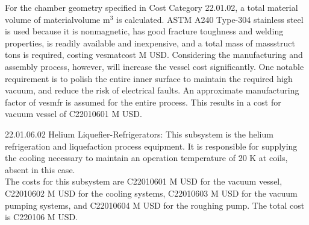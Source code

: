 For the chamber geometry specified in Cost Category 22.01.02, a total material volume of materialvolume m$^3$ is calculated. ASTM A240 Type-304 stainless steel is used because it is nonmagnetic, has good fracture toughness and welding properties, is readily available and inexpensive, and a total mass of massstruct tons is required, costing vesmatcost M USD. Considering the manufacturing and assembly process, however, will increase the vessel cost significantly. One notable requirement is to polish the entire inner surface to maintain the required high vacuum, and reduce the risk of electrical faults. An approximate manufacturing factor of vesmfr is assumed for the entire process. This results in a cost for vacuum vessel of C22010601 M USD.\\

\begin{table}[h]
    \centering
    \caption{Vacuum vessel parameters.}
    \label{tab:ves_params}
\end{table}






22.01.06.02 Helium Liquefier-Refrigerators: This subsystem is the helium refrigeration and liquefaction process equipment. It is responsible for supplying the cooling necessary to maintain an operation temperature of 20 K at coils, absent in this case. \\

The costs for this subsystem are C22010601 M USD for the vacuum vessel, C22010602 M USD for the cooling systems, C22010603 M USD for the vacuum pumping systems, and C22010604 M USD for the roughing pump. The total cost is C220106 M USD.\\


